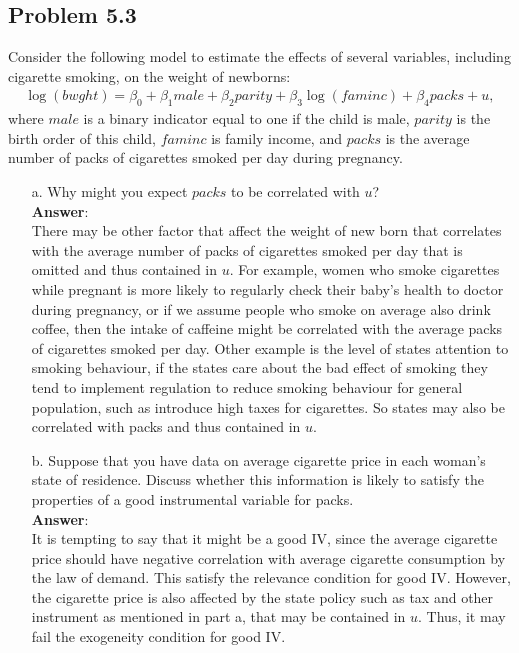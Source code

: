 \documentclass[10pt]{article}
\begin{document}
\subsection*{Problem 5.3}
Consider the following model to estimate the effects of several variables, including cigarette smoking, on the weight of newborns:
\begin{align}
    \log(bwght)=\beta_0+\beta_1male+\beta_2parity+\beta_3\log(faminc)+\beta_4packs+u, \tag{5.54}\label{5.54}
\end{align}
where $male$ is a binary indicator equal to one if the child is male, $parity$ is the birth order of this child, $faminc$ is family income, and $packs$ is the average number of packs of cigarettes smoked per day during pregnancy.
\begin{enumerate}
\item[a.] Why might you expect $packs$ to be correlated with $u$?
\\ \textbf{Answer}:\\
There may be other factor that affect the weight of new born that correlates with the average number of packs of cigarettes smoked per day that is omitted and thus contained in $u$. For example, women who smoke cigarettes while pregnant is more likely to regularly check their baby's health to doctor during pregnancy, or if we assume people who smoke on average also drink coffee, then the intake of caffeine might be correlated with the average packs of cigarettes smoked per day. Other example is the level of states attention to smoking behaviour, if the states care about the bad effect of smoking they tend to implement regulation to reduce smoking behaviour for general population, such as introduce high taxes for cigarettes. So states may also be correlated with packs and thus contained in $u$.

\item[b.] Suppose that you have data on average cigarette price in each woman's state of residence. Discuss whether this information is likely to satisfy the properties of a good instrumental variable for packs.
\\ \textbf{Answer}:\\
It is tempting to say that it might be a good IV, since the average cigarette price should have negative correlation with average cigarette consumption by the law of demand. This satisfy the relevance condition for good IV. However, the cigarette price is also affected by the state policy such as tax and other instrument as mentioned in part a, that may be contained in $u$. Thus, it may fail the exogeneity condition for good IV.


\end{enumerate}
\end{document}
